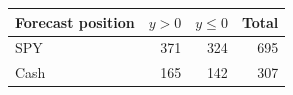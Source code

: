 \begin{tabular}{lrrr}
\toprule
Forecast position & $y>0$ & $y\leq 0$ & Total \\
\midrule
SPY & 371 & 324 & 695 \\
Cash & 165 & 142 & 307 \\
\bottomrule
\end{tabular}
